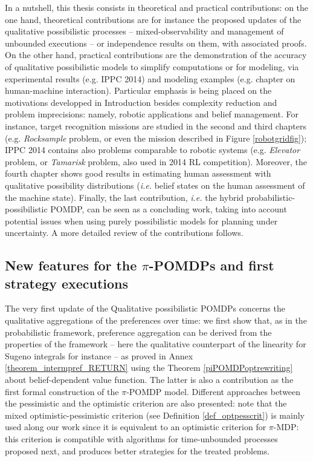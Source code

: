 In a nutshell, 
this thesis consists in
theoretical and practical contributions:
on the one hand, theoretical contributions 
are for instance 
the proposed updates of the qualitative possibilistic processes
-- mixed-observability and management of unbounded executions -- 
or independence results on them, with associated proofs.
On the other hand, 
practical contributions
are the demonstration of the accuracy 
of qualitative possibilistic models
to simplify computations or for modeling,
via experimental results (e.g. IPPC 2014) 
and modeling examples (e.g. chapter on human-machine interaction).
Particular emphasis is being placed 
on the motivations developped in Introduction
besides complexity reduction and problem imprecisions:
namely, robotic applications and belief management.
For instance, target recognition missions 
are studied in the second and third chapters 
(e.g. \textit{Rocksample} problem, 
or even the mission described in Figure \ref{robotgridfig});
IPPC 2014 contains also problems comparable to robotic systems 
(e.g. \textit{Elevator} problem, or \textit{Tamarisk} problem, also used in 2014 RL competition). 
Moreover, the fourth chapter shows good results 
in estimating human assessment with qualitative possibility distributions
(\textit{i.e.} belief states on the human assessment of the machine state).
Finally, the last contribution, 
\textit{i.e.} the hybrid probabilistic-possibilistic POMDP, 
can be seen as a concluding work, taking into account
potential issues when using purely possibilistic models 
for planning under uncertainty.
A more detailed review of the contributions follows.

\subsection*{New features for the $\pi$-POMDPs
and first strategy executions}
The very first update 
of the Qualitative possibilistic POMDPs \cite{Sabbadin:1999:pipomdp} 
concerns the qualitative aggregations 
of the preferences over time:
we first show that, 
as in the probabilistic framework,
preference aggregation can be derived 
from the properties of the framework 
-- here the qualitative counterpart 
of the linearity
for Sugeno integrals for instance --
as proved in Annex \ref{theorem_intermpref_RETURN} 
using the Theorem \ref{piPOMDPoptrewriting} 
about belief-dependent value function.
The latter is also a contribution 
as the first formal construction
of the $\pi$-POMDP model.
Different approaches between the pessimistic and the optimistic criterion
are also presented: 
note that the mixed optimistic-pessimistic criterion 
(see Definition \ref{def_optpesscrit}) 
is mainly used along our work 
since it is equivalent to 
an optimistic criterion for $\pi$-MDP:
this criterion is compatible 
with algorithms for time-unbounded processes proposed next,
and produces better strategies 
for the treated problems.

